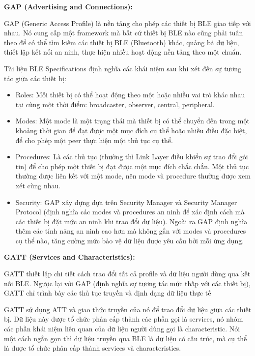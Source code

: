 \textbf{GAP (Advertising and Connections):}

GAP (Generic Access Profile) là nền tảng cho phép các thiết bị BLE giao tiếp với nhau. Nó cung cấp một framework mà bất cứ thiết bị BLE nào cũng phải tuân theo để có thể tìm kiếm các thiết bị BLE (Bluetooth) khác, quảng bá dữ liệu, thiết lập kết nối an ninh, thực hiện nhiều hoạt động nền tảng theo một chuẩn.

Tài liệu BLE Specifications định nghĩa các khái niệm sau khi xét đến sự tương tác giữa các thiết bị:
\begin{itemize}
    \item Roles: Mỗi thiết bị có thể hoạt động theo một hoặc nhiều vai trò khác nhau tại cùng một thời điểm: broadcaster, observer, central, peripheral.
    \item Modes: Một mode là một trạng thái mà thiết bị có thể chuyển đến trong một khoảng thời gian để đạt được một mục đích cụ thể hoặc nhiều điều đặc biệt, để cho phép một peer thực hiện một thủ tục cụ thể.
    \item Procedures: Là các thủ tục (thường thì Link Layer điều khiển sự trao đổi gói tin) để cho phép một thiết bị đạt được một mục đích chắc chắn. Một thủ tục thường được liên kết với một mode, nên mode và procedure thường được xem xét cùng nhau.
    \item Security: GAP xây dựng dựa trên Security Manager và Security Manager Protocol (định nghĩa các modes và procedures an ninh để xác định cách mà các thiết bị đặt mức an ninh khi trao đổi dữ liệu). Ngoài ra GAP định nghĩa thêm các tính năng an ninh cao hơn mà không gắn với modes và procedures cụ thể nào, tăng cường mức bảo vệ dữ liệu được yêu cầu bởi mỗi ứng dụng.
\end{itemize}

\textbf{GATT (Services and Characteristics):}

GATT thiết lập chi tiết cách trao đổi tất cả profile và dữ liệu người dùng qua kết nối BLE. Ngược lại với GAP (định nghĩa sự tương tác mức thấp với các thiết bị), GATT chỉ trình bày các thủ tục truyền và định dạng dữ liệu thực tế

GATT sử dụng ATT và giao thức truyền của nó để trao đổi dữ liệu giữa các thiết bị. Dữ liệu này được tổ chức phân cấp thành các phần gọi là services, nó nhóm các phần khái niệm liên quan của dữ liệu người dùng gọi là characteristic. Nói một cách ngắn gọn thì dữ liệu truyền qua BLE là dữ liệu có cấu trúc, mà cụ thể là được tổ chức phân cấp thành services và characteristics.

